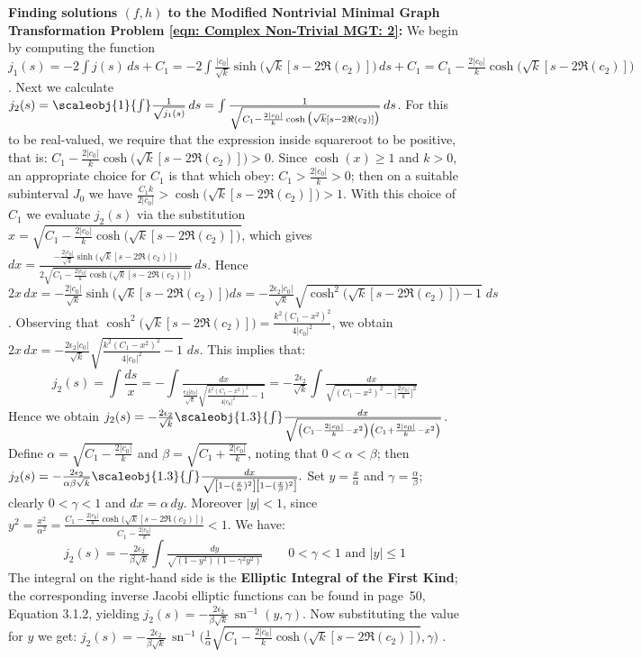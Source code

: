 \documentclass[12pt]{article}
\theoremstyle{plain}
\theoremstyle{definition}
\theoremstyle{remark}
\begin{document}
 \textbf{Finding solutions \((f,h)\) to the Modified Nontrivial Minimal Graph Transformation Problem \ref{eqn: Complex Non-Trivial MGT: 2}:}  We begin by computing the function \(j_1(s) = -2\int j(s)\,ds + C_1 = -2\int \tfrac{|c_0|}{\sqrt{k}}\sinh\big(\sqrt k[s-2\Re(c_2)]\big)\,ds + C_1 = C_1 - \tfrac{2|c_0|}{k}\cosh\big(\sqrt k[s-2\Re(c_2)]\big)\). Next we calculate \(j_2(s) = \scaleobj{1}{\int} \tfrac{1}{\sqrt{j_1(s)}}\,ds = \int \tfrac{1}{\sqrt{C_1 - \frac{2|c_0|}{k}\cosh\big(\sqrt k[s-2\Re(c_2)]\big)}}\,ds\). For this to be real-valued, we require that the expression inside squareroot to be positive, that is: \(C_1 - \tfrac{2|c_0|}{k}\cosh\big(\sqrt k[s-2\Re(c_2)]\big) > 0\). Since \(\cosh(x) \ge 1\) and \(k>0\), an appropriate choice for \(C_1\) is that which obey: \(C_1 > \frac{2|c_0|}{k} > 0\); then on a suitable subinterval \(J_0\) we have \(\frac{C_1k}{2|c_0|} > \cosh\big(\sqrt k[s-2\Re(c_2)]\big) > 1\). With this choice of \(C_1\) we evaluate \(j_2(s)\) via the substitution \footnotesize\(x = \sqrt{C_1 - \frac{2|c_0|}{k}\cosh\big(\sqrt k[s-2\Re(c_2)]\big)}\)\normalsize, which gives \footnotesize\(dx = \tfrac{-\frac{2|c_0|}{\sqrt k}\sinh\big(\sqrt k[s-2\Re(c_2)]\big)}{2\sqrt{C_1 - \frac{2|c_0|}{k}\cosh\big(\sqrt k[s-2\Re(c_2)]\big)}}\,ds\)\normalsize. Hence \footnotesize\(2x\,dx = -\tfrac{2|c_0|}{\sqrt k}\sinh\big(\sqrt k[s-2\Re(c_2)]\big)ds = -\frac{2\epsilon_2|c_0|}{\sqrt k}\sqrt{\cosh^2\big(\sqrt k[s-2\Re(c_2)]\big)-1} \;ds\)\normalsize. Observing that \(\cosh^2\big(\sqrt k[s-2\Re(c_2)]\big) = \frac{k^2(C_1-x^2)^2}{4|c_0|^2}\), we obtain \(2x\,dx = -\frac{2\epsilon_2|c_0|}{\sqrt k}\sqrt{\frac{k^2(C_1-x^2)^2}{4|c_0|^2}-1}\;ds\). This implies that:
 \[
   j_2(s)=\int \frac{ds}{x}=- \int \tfrac{dx}{\frac{\epsilon_2|c_0|}{\sqrt k}\sqrt{\frac{k^2(C_1-x^2)^2}{4|c_0|^2}-1}}=-\tfrac{2\epsilon_2}{\sqrt k} \int \tfrac{dx}{\sqrt{(C_1-x^2)^2-\big[\frac{2|c_0|}{k}\big]^2}}
 \]
 Hence we obtain \(j_2(s)=-\frac{2\epsilon_2}{\sqrt k} \scaleobj{1.3}{\int} \tfrac{dx}{\sqrt{\left(C_1-\frac{2|c_0|}{k}-x^2\right)\left(C_1+\frac{2|c_0|}{k}-x^2\right)}}\).  
Define  \(\alpha= \sqrt{C_1-\frac{2|c_0|}{k}}\)  and \(\beta=\sqrt{C_1+\frac{2|c_0|}{k}}\), noting that \(0<\alpha<\beta\); then  
\(j_2(s)=-\tfrac{2\epsilon_2}{\alpha \beta \sqrt k} \scaleobj{1.3}{\int} \tfrac{dx}{\sqrt{\left[1-(\frac{x}{\alpha})^2\right]\left[1-(\frac{x}{\beta})^2\right]}}.\) 
Set \(y=\frac{x}{\alpha}\) and \(\gamma=\frac{\alpha}{\beta}\); clearly \(0<\gamma<1\) and \(dx=\alpha\,dy\).  
Moreover \(|y|<1\), since \(y^2=\frac{x^2}{\alpha^2}= \frac{C_1-\frac{2|c_0|}{k}\cosh\!\big(\sqrt k[s-2\Re(c_2)]\big)}{C_1-\frac{2|c_0|}{k}}<1\). We have: 
 \[
   j_2(s)=-\tfrac{2\epsilon_2}{\beta\sqrt k} \int \tfrac{dy}{\sqrt{\left(1-y^2\right)\left(1-\gamma^2y^2\right)}}   \qquad\text{$0<\gamma<1$ and $|y|\leq1$} 
 \]
 The integral on the right‑hand side is the \textbf{Elliptic Integral of the First Kind}; the corresponding inverse Jacobi elliptic functions can be found in \cite{La} page~50, Equation 3.1.2, yielding \(j_2(s)=-\tfrac{2\epsilon_2}{\beta\sqrt k}\,\operatorname{sn}^{-1}(y,\gamma).\) Now substituting the value for \(y\) we get: \footnotesize \(j_2(s)=-\tfrac{2\epsilon_2}{\beta\sqrt k}\,\operatorname{sn}^{-1} \big(\tfrac{1}{\alpha}\sqrt{C_1 - \tfrac{2|c_0|}{k}\cosh\big(\sqrt k[s-2\Re(c_2)]\big)},\gamma \big)\) \normalsize. 
 
\end{document}
